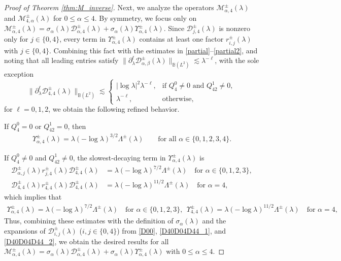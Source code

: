 \documentclass[reqno]{amsart}
\numberwithin{equation}{section}
\begin{document}
\begin{proof}[Proof of Theorem \ref{thm:M_inverse}]
Next, we analyze the operators $\mathcal{M}_{\alpha,4}^{\pm}(\lambda)$ and $\mathcal{M}_{4,\alpha}^{\pm}(\lambda)$ for $0 \le \alpha \le 4$. By symmetry, we focus only on $\mathcal{M}_{\alpha,4}^{\pm}(\lambda) = \sigma_\alpha(\lambda) \mathcal{D}_{\alpha,4}^\pm(\lambda) + \sigma_\alpha(\lambda) \Upsilon_{\alpha,4}^\pm(\lambda)$. Since $\mathcal{D}_{j,4}^\pm(\lambda)$ is nonzero only for $j \in \{0,4\}$, every term in $\Upsilon_{\alpha,4}^\pm(\lambda)$ contains at least one factor $r_{i,j}^\pm(\lambda)$ with  $j \in\{0,4\}$. Combining this fact with the estimates in \eqref{partial}--\eqref{partial2}, and noting that all leading entries satisfy $\|\partial_\lambda^\ell \mathcal{D}_{\alpha,\beta}^{\pm}(\lambda)\|_{\mathbb{B}(L^2)} \lesssim \lambda^{-\ell}$, with the sole exception
\[
\|\partial_\lambda^\ell \mathcal{D}_{4,4}^{\pm}(\lambda)\|_{\mathbb{B}(L^2)} \lesssim 
\begin{cases}
|\log \lambda|^2 \lambda^{-\ell}, & \text{if } Q_4^0 \neq 0 \text{ and } Q_{42}^1 \neq 0, \\
\lambda^{-\ell}, & \text{otherwise},
\end{cases}
\]
for $\ell = 0,1,2$, we obtain the following refined behavior.

If $Q_4^0 = 0$ or $Q_{42}^1 = 0$, then
\begin{align}\label{Upsilon44-2}
\Upsilon_{\alpha,4}^\pm(\lambda) = \lambda (-\log \lambda)^{3/2} \Lambda^\pm(\lambda) \qquad \text{for all } \alpha \in \{0,1,2,3,4\}.
\end{align}

If $Q_4^0 \neq 0$ and $Q_{42}^1 \neq 0$, the slowest-decaying term in $\Upsilon_{\alpha,4}^\pm(\lambda)$ is
\begin{align*}
\mathcal{D}_{\alpha,j}^{\pm}(\lambda)r_{j,4}^\pm(\lambda) \mathcal{D}_{4,4}^{\pm}(\lambda) &= \lambda (-\log \lambda)^{7/2} \Lambda^\pm(\lambda) \quad \text{for } \alpha \in \{0,1,2,3\},\\
\mathcal{D}_{4,4}^{\pm}(\lambda) r_{4,4}^\pm(\lambda) \mathcal{D}_{4,4}^{\pm}(\lambda) &= \lambda (-\log \lambda)^{11/2} \Lambda^\pm(\lambda)\quad \text{for } \alpha = 4,
\end{align*}
which implies that
\begin{align}\label{Upsilon44}
\Upsilon_{\alpha,4}^\pm(\lambda)= \lambda (-\log \lambda)^{7/2} \Lambda^\pm(\lambda) \quad \text{for } \alpha \in \{0,1,2,3\},\ \
	\Upsilon_{4,4}^\pm(\lambda)= \lambda (-\log \lambda)^{11/2} \Lambda^\pm(\lambda)\quad \text{for } \alpha = 4,
\end{align}
Thus, combining these estimates with the definition of $\sigma_\alpha(\lambda)$ and the expansions of $\mathcal{D}_{i,j}^{\pm}(\lambda)$ ($i,j \in \{0,4\}$) from \eqref{D00}, \eqref{D40D04D44_1}, and \eqref{D40D04D44_2}, we obtain the desired results for all $\mathcal{M}_{\alpha,4}^{\pm}(\lambda) = \sigma_\alpha(\lambda) \mathcal{D}_{\alpha,4}^\pm(\lambda) + \sigma_\alpha(\lambda) \Upsilon_{\alpha,4}^\pm(\lambda)$ with $0 \le \alpha \le 4$.


\end{proof}
\end{document}
